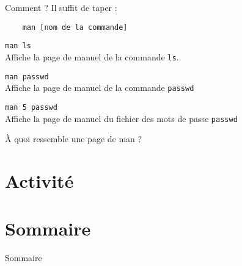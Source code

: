 \documentclass{beamer}
\begin{document}
\begin{frame}[fragile]{Comment ?}
  Il suffit de taper :
  \begin{verbatim}
    man [nom de la commande]
  \end{verbatim}
  
  \bi[<+- | alert@+>]
    \item\texttt{man ls}\\
    Affiche la page de manuel de la commande \texttt{ls}.
    \item \texttt{man passwd}\\
    Affiche la page de manuel de la commande \texttt{passwd}
    \item \texttt{man 5 passwd}\\
    Affiche la page de manuel du fichier des mots de passe \texttt{passwd}
  \ei
\end{frame}

\begin{frame}[fragile]{À quoi ressemble une page de man ?}
\end{frame}


\section{Activité}

\section*{Sommaire}

\begin{frame}{Sommaire}
  \tableofcontents
\end{frame}
\end{document}
